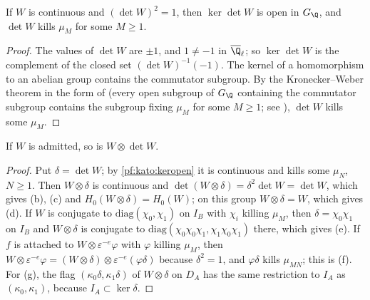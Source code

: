\begin{lemma}\label{pf:kato:keropen}
If $W$ is continuous and $(\det W)^2=1$, then $\ker\det W$ is open in $G_\Q$, and $\det W$ kills $\mu_M$ for
some $M\ge1$.
\end{lemma}

\begin{proof}
The values of $\det W$ are $\pm1$, and $1\ne-1$ in $\katoQlb$; so $\ker\det W$ is the complement of the closed
set $(\det W)^{-1}(-1)$. The kernel of a homomorphism to an abelian group contains the commutator subgroup. By
the Kronecker--Weber theorem in the form of  (every open subgroup of $G_\Q$
containing the commutator subgroup contains the subgroup fixing $\mu_M$ for some $M\ge1$; see
\cite[Ch.~14]{Washington1997}), $\det W$ kills some $\mu_M$.
\end{proof}

\begin{lemma}\label{pf:kato:twdet}
If $W$ is admitted, so is $W\otimes\det W$.
\end{lemma}

\begin{proof}
Put $\delta=\det W$; by \cref{pf:kato:keropen} it is continuous and kills some $\mu_N$, $N\ge1$. Then
$W\otimes\delta$ is continuous and $\det(W\otimes\delta)=\delta^2\det W=\det W$, which gives (b), (c) and
$H_0(W\otimes\delta)=H_0(W)$; on this group $W\otimes\delta=W$, which gives (d). If $W$ is conjugate to
$\mathrm{diag}(\chi_0,\chi_1)$ on $I_B$ with $\chi_i$ killing $\mu_M$, then $\delta=\chi_0\chi_1$ on $I_B$ and $W\otimes\delta$
is conjugate to $\mathrm{diag}(\chi_0\chi_0\chi_1,\chi_1\chi_0\chi_1)$ there, which gives (e). If $f$ is attached to
$W\otimes\varepsilon^{-e}\varphi$ with $\varphi$ killing $\mu_M$, then
$W\otimes\varepsilon^{-e}\varphi=(W\otimes\delta)\otimes\varepsilon^{-e}(\varphi\delta)$ because $\delta^2=1$, and $\varphi\delta$ kills
$\mu_{MN}$; this is (f). For (g), the flag $(\kappa_0\delta,\kappa_1\delta)$ of $W\otimes\delta$ on $D_A$ has the same
restriction to $I_A$ as $(\kappa_0,\kappa_1)$, because $I_A\subset\ker\delta$.
\end{proof}

